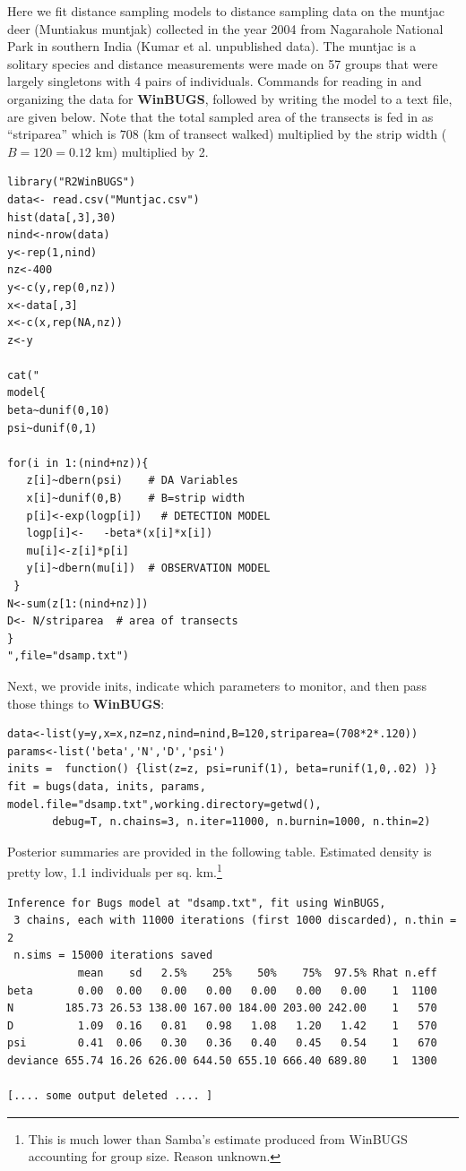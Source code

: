 Here we fit distance sampling models to distance sampling data on the
muntjac deer (Muntiakus muntjak) collected in the year 2004 from
Nagarahole National Park in southern India
(Kumar et al. unpublished data). The muntjac is
a solitary species and distance measurements were made on 57 groups
that were largely singletons with 4 pairs of individuals.  Commands
for reading in and organizing the data for {\bf WinBUGS}, followed by
writing the model to a text file, are given below. Note that the total sampled area of
the transects is fed in as ``striparea'' which is $708$ (km of transect walked)
multiplied by the strip width ($B=120 = 0.12$ km) multiplied by 2.
{\small 
\begin{verbatim}
library("R2WinBUGS")
data<- read.csv("Muntjac.csv")
hist(data[,3],30)
nind<-nrow(data)
y<-rep(1,nind)
nz<-400
y<-c(y,rep(0,nz))
x<-data[,3]
x<-c(x,rep(NA,nz))
z<-y

cat("
model{
beta~dunif(0,10)
psi~dunif(0,1)

for(i in 1:(nind+nz)){
   z[i]~dbern(psi)    # DA Variables
   x[i]~dunif(0,B)    # B=strip width
   p[i]<-exp(logp[i])   # DETECTION MODEL
   logp[i]<-   -beta*(x[i]*x[i])
   mu[i]<-z[i]*p[i]
   y[i]~dbern(mu[i])  # OBSERVATION MODEL
 }
N<-sum(z[1:(nind+nz)])
D<- N/striparea  # area of transects
}
",file="dsamp.txt")
\end{verbatim}
}
Next, we provide inits, indicate which parameters to monitor, and then
pass those things to {\bf WinBUGS}:
{\small
\begin{verbatim}
data<-list(y=y,x=x,nz=nz,nind=nind,B=120,striparea=(708*2*.120))
params<-list('beta','N','D','psi')
inits =  function() {list(z=z, psi=runif(1), beta=runif(1,0,.02) )}
fit = bugs(data, inits, params, model.file="dsamp.txt",working.directory=getwd(),    
       debug=T, n.chains=3, n.iter=11000, n.burnin=1000, n.thin=2)
\end{verbatim}
}
Posterior summaries are provided in the following table. Estimated
density is pretty low, 1.1 individuals per sq. km.\footnote{ This is much
  lower than Samba's estimate produced from WinBUGS accounting for group
  size. Reason unknown. }
{\small
\begin{verbatim}
Inference for Bugs model at "dsamp.txt", fit using WinBUGS,
 3 chains, each with 11000 iterations (first 1000 discarded), n.thin = 2
 n.sims = 15000 iterations saved
           mean    sd   2.5%    25%    50%    75%  97.5% Rhat n.eff
beta       0.00  0.00   0.00   0.00   0.00   0.00   0.00    1  1100
N        185.73 26.53 138.00 167.00 184.00 203.00 242.00    1   570
D          1.09  0.16   0.81   0.98   1.08   1.20   1.42    1   570
psi        0.41  0.06   0.30   0.36   0.40   0.45   0.54    1   670
deviance 655.74 16.26 626.00 644.50 655.10 666.40 689.80    1  1300

[.... some output deleted .... ]
\end{verbatim}
}

